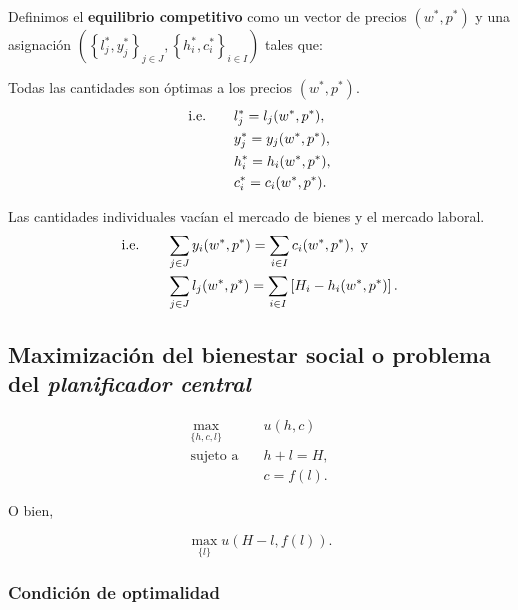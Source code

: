 \documentclass[8pt,a4paper]{extarticle}
\begin{document}
\begin{multicols}{3}
\begin{boxdef}
	Definimos el \textbf{equilibrio competitivo} como un vector de precios $(w^*, p^*)$ y una asignación $\left( \left\{ l^*_j, y^*_j \right\}_{j \in J}, \left\{ h^*_i, c^*_i \right\}_{i \in I} \right)$ tales que:
	\begin{eqlist}
	\item Todas las cantidades son óptimas a los precios $(w^*, p^*)$.
		\begin{equation*}
			\begin{aligned}
				\text{\normalfont i.e.} \qquad & l^*_j = l_j(w^*, p^*), \\
				           & y^*_j = y_j(w^*, p^*), \\
						   & h^*_i = h_i(w^*, p^*), \\
					       & c^*_i = c_i(w^*, p^*).
			\end{aligned}
		\end{equation*}
	\item Las cantidades individuales vacían el mercado de bienes y el mercado laboral.
		\begin{equation*}
			\begin{aligned}
				\text{\normalfont i.e.} \qquad & \sum_{j \in J} y_i(w^*, p^*) = \sum_{i \in I} c_i(w^*, p^*),\ \text{y} \\
						   & \sum_{j \in J} l_j(w^*, p^*) = \sum_{i \in I} \left[ H_i - h_i(w^*, p^*) \right].
			\end{aligned}
		\end{equation*}
	\end{eqlist}
\end{boxdef}

\subsection{Maximización del bienestar social o problema del \emph{planificador central}}

\begin{equation*}
	\begin{aligned}
		\max_{\{h, c, l\}}\   & u(h, c) \\
		\text{sujeto a} \quad & h + l = H, \\
							  & c = f(l).
	\end{aligned}
\end{equation*}

O bien,

\[
	\max_{\{l\}} u(H - l, f(l))
.\] 

\subsubsection*{Condición de optimalidad}


\end{multicols}
\end{document}
